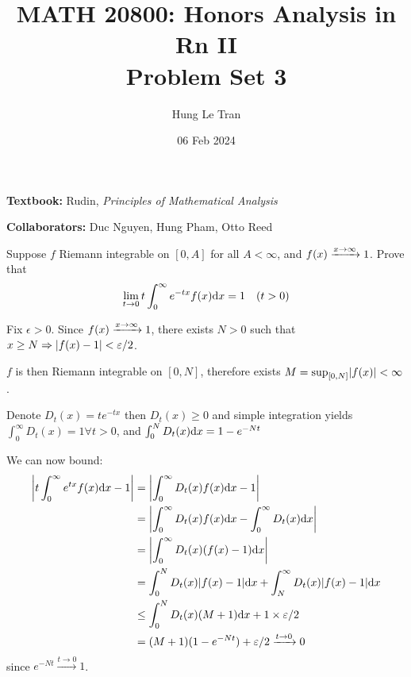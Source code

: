 \documentclass[a4paper, 12pt]{article}
\title{MATH 20800: Honors Analysis in Rn II \\ \large Problem Set 3}
\date{06 Feb 2024}
\author{Hung Le Tran}
\begin{document}
\maketitle
\setcounter{section}{3}
\textbf{Textbook:} Rudin, \textit{Principles of Mathematical Analysis} 

\textbf{Collaborators:} Duc Nguyen, Hung Pham, Otto Reed
\begin{problem} 
    Suppose $f$ Riemann integrable on $[0, A]$ for all $A < \infty$, and $f(x) \cvgx 1$. Prove that \begin{equation*}
    \lim_{t \to 0}t \int_{0}^{\infty} e^{-tx} f(x) \dx = 1 \quad (t > 0)
    \end{equation*}
\end{problem}
\begin{solution}
    Fix $\epsilon > 0$. Since $f(x) \cvgx 1$, there exists $N> 0$ such that $x \geq N \implies \abs{f(x) - 1} < \epsilon/2$.

    $f$ is then Riemann integrable on $[0, N]$, therefore exists $M = \sup_{[0, N]} \abs{f(x)} < \infty$.

    Denote $D_t(x) = te^{-tx}$ then $D_t(x) \geq 0$ and simple integration yields $\int_{0}^{\infty} D_t(x) = 1 \forall t > 0$, and $\int_{0}^{N} D_t(x) \dx = 1 - e^{-Nt}$

    We can now bound: 
    \begin{align*}
        \abs*{t \int_{0}^{\infty} e^{tx} f(x) \dx - 1} &= \abs*{\int_{0}^{\infty} D_t(x) f(x) \dx - 1}\\
        &= \abs*{\int_{0}^{\infty}D_t (x) f(x) \dx - \int_{0}^{\infty} D_t(x) \dx } \\
        &= \abs*{\int_{0}^{\infty} D_t(x) (f(x) - 1) \dx } \\
        &= \int_{0}^{N} D_t(x) \abs{f(x) - 1} \dx  + \int_{N}^{\infty} D_t(x) \abs{f(x) - 1} \dx \\
        &\leq \int_{0}^{N} D_t(x) (M + 1) \dx + 1 \times \epsilon/2 \\
        &= (M+1) (1 - e^{-Nt}) + \epsilon/2 \xrightarrow{t \to 0} 0
    \end{align*}
    since $e^{-Nt} \xrightarrow{t \to 0} 1$.
\end{solution}
\end{document}
